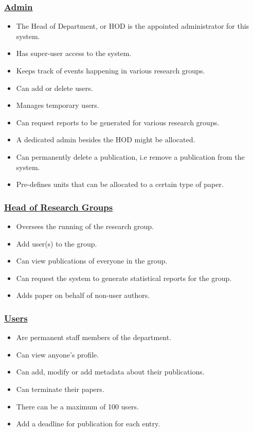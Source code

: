\documentclass[a4paper,12pt]{article}
\begin{document}
\subsubsection{\underline{Admin}}
\begin{itemize}
\item The Head of Department, or HOD is the appointed administrator for this system.
\item Has super-user access to the system.
\item Keeps track of events happening in various research groups. 
\item Can add or delete users.
\item Manages temporary users.
\item Can request reports to be generated for various research groups.
\item A dedicated admin besides the HOD might be allocated.
\item Can permanently delete a publication, i.e remove a publication from the system.
\item Pre-defines units that can be allocated to a certain type of paper.
\end{itemize}

\subsubsection{\underline{Head of Research Groups}}
\begin{itemize}
\item Oversees the running of the research group.
\item Add user(s) to the group.
\item Can view publications of everyone in the group.
\item Can request the system to generate statistical reports for the group.
\item Adds paper on behalf of non-user authors.
\end{itemize}

\subsubsection{\underline{Users}}
\begin{itemize}
\item Are permanent staff members of the department.
\item Can view anyone's profile.
\item Can add, modify or add metadata about their publications.
\item Can terminate their papers.
\item There can be a maximum of 100 users.
\item Add a deadline for publication for each entry.
\end{itemize}
\end{document}
